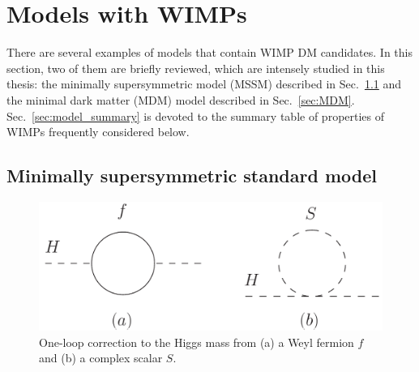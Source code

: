 \documentclass[12pt,twoside,book]{article}
\begin{document}
\section{Models with WIMPs}
\setcounter{equation}{0}

\vskip 0.1in

There are several examples of models that contain WIMP DM candidates.
In this section, two of them are briefly reviewed, which are intensely studied in this thesis: the minimally supersymmetric model (MSSM) described in Sec.~\ref{sec:MSSM} and the minimal dark matter (MDM) model described in Sec.~\ref{sec:MDM}.
Sec.~\ref{sec:model_summary} is devoted to the summary table of properties of WIMPs frequently considered below.

\subsection{Minimally supersymmetric standard model}
\label{sec:MSSM}


\begin{figure}[b]
  \centering
  \includegraphics[width=0.6\hsize]{loop_correction.pdf}
  \caption{One-loop correction to the Higgs mass from (a) a Weyl fermion $f$ and (b) a complex scalar $S$.}
  \label{fig:loop_correction}
\end{figure}
\end{document}
